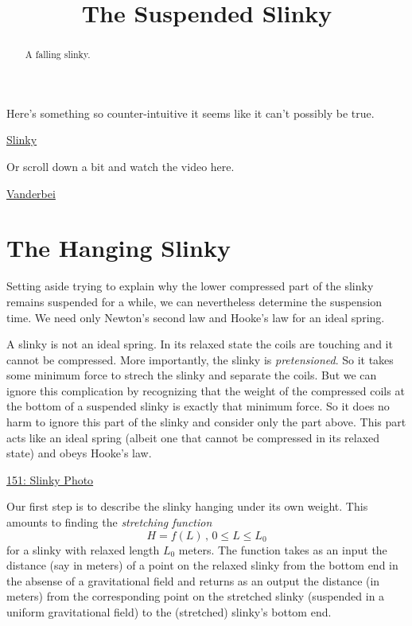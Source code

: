 \documentclass{ximera}
\title{The Suspended Slinky}
\begin{document}
\begin{abstract}
A falling slinky.
\end{abstract}
\maketitle

Here's something so counter-intuitive it seems like it can't possibly be true.

\begin{center}  
\end{center}


\href{https://www.youtube.com/watch?v=k5s1cMNTmGs}{Slinky}



Or scroll down a bit and watch the video here.

\href{dsffdhttps://vanderbei.princeton.edu/WebGL/Slinky.html}{Vanderbei}

\section{The Hanging Slinky}

Setting aside trying to explain why the lower compressed part of the slinky remains suspended for a while, we can nevertheless determine the suspension time. We need only Newton's second law and Hooke's law for an ideal spring.

A slinky is not an ideal spring. In its relaxed state the coils are touching and it cannot be compressed. More importantly, the slinky is \emph{pretensioned}. So it takes some minimum force to strech the slinky and separate the coils. But we can ignore this complication by recognizing that the weight of the compressed coils at the bottom of a suspended slinky is exactly that minimum force. So it does no harm to ignore this part of the slinky and consider only the part above. This part acts like an ideal spring (albeit one that cannot be compressed in its relaxed state) and obeys Hooke's law.

\begin{onlineOnly}
    \begin{center}
\end{center}
\end{onlineOnly}

\href{https://www.desmos.com/calculator/zqjjgael5j}{151: Slinky Photo}



Our first step is to describe the slinky hanging under its own weight. This amounts to finding the \emph{stretching function}
\[
   H = f(L) \, , \, 0\leq L \leq L_0 
\]
for a slinky with relaxed length $L_0$ meters. The function takes as an input the distance (say in meters) of a point on the relaxed slinky from the bottom end in the absense of a gravitational field and returns as an output the distance (in meters) from the corresponding point on the stretched slinky (suspended in a uniform gravitational field) to the (stretched) slinky's bottom end. 
\end{document}
